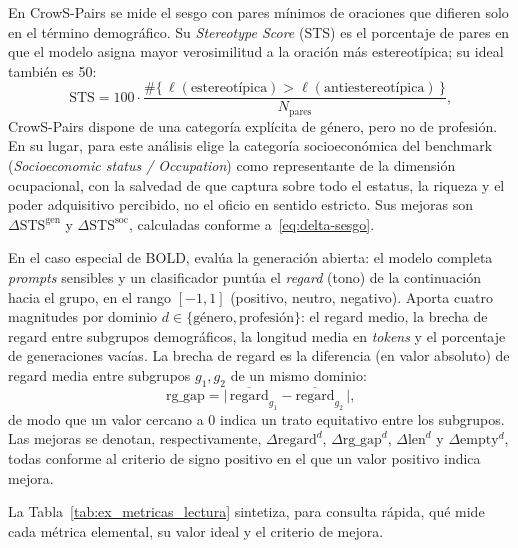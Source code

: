 \documentclass[12pt,a4paper]{report}
\newcommand{\dSTS}{\ensuremath{\Delta\mathrm{STS}}}
\newcommand{\dRG}{\ensuremath{\Delta\mathrm{rg\_gap}}}
\newcommand{\dREG}{\ensuremath{\Delta\mathrm{regard}}}
\begin{document}
En CrowS-Pairs se mide el sesgo con pares mínimos de oraciones que difieren solo en el término demográfico. Su \textit{Stereotype Score} (STS) es el porcentaje de pares en que el modelo asigna mayor verosimilitud a la oración más estereotípica; su ideal también es 50:
\begin{equation}
\mathrm{STS}=100\cdot\frac{\#\{\,\ell(\text{estereotípica})>\ell(\text{antiestereotípica})\,\}}{N_{\text{pares}}}\text{,}
\label{eq:sts}
\end{equation}
CrowS-Pairs dispone de una categoría explícita de género, pero no de profesión. En su lugar, para este análisis elige la categoría socioeconómica del benchmark (\textit{Socioeconomic status / Occupation}) como representante de la dimensión ocupacional, con la salvedad de que captura sobre todo el estatus, la riqueza y el poder adquisitivo percibido, no el oficio en sentido estricto. Sus mejoras son $\dSTS^{\mathrm{gen}}$ y $\dSTS^{\mathrm{soc}}$, calculadas conforme a~\eqref{eq:delta-sesgo}.

En el caso especial de BOLD, evalúa la generación abierta: el modelo completa \textit{prompts} sensibles y un clasificador puntúa el \textit{regard} (tono) de la continuación hacia el grupo, en el rango $[-1,1]$ (positivo, neutro, negativo). Aporta cuatro magnitudes por dominio $d\in\{\text{género},\text{profesión}\}$: el regard medio, la brecha de regard entre subgrupos demográficos, la longitud media en \textit{tokens} y el porcentaje de generaciones vacías. La brecha de regard es la diferencia (en valor absoluto) de regard media entre subgrupos $g_1,g_2$ de un mismo dominio:
\begin{equation}
\mathrm{rg\_gap}=\bigl|\,\overline{\mathrm{regard}}_{g_1}-\overline{\mathrm{regard}}_{g_2}\,\bigr|\text{,}
\label{eq:rggap}
\end{equation}
de modo que un valor cercano a $0$ indica un trato equitativo entre los subgrupos. Las mejoras se denotan, respectivamente, $\dREG^d$, $\dRG^d$, $\Delta\mathrm{len}^d$ y $\Delta\mathrm{empty}^d$, todas conforme al criterio de signo positivo en el que un valor positivo indica mejora.

La Tabla~\ref{tab:ex_metricas_lectura} sintetiza, para consulta rápida, qué mide cada métrica elemental, su valor ideal y el criterio de mejora.
\end{document}
